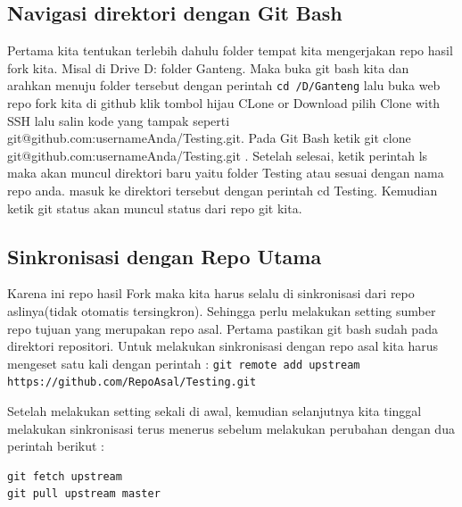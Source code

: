 \subsection{Navigasi direktori dengan Git Bash}
Pertama kita tentukan terlebih dahulu folder tempat kita mengerjakan repo hasil fork kita. Misal di Drive D: folder Ganteng. Maka buka git bash kita dan arahkan menuju folder tersebut dengan perintah \verb|cd /D/Ganteng| lalu buka web repo fork kita di github klik tombol hijau CLone or Download pilih Clone with SSH lalu salin kode yang tampak seperti git@github.com:usernameAnda/Testing.git. Pada Git Bash ketik git clone git@github.com:usernameAnda/Testing.git . Setelah selesai, ketik perintah ls maka akan muncul direktori baru yaitu folder Testing atau sesuai dengan nama repo anda. masuk ke direktori tersebut dengan perintah cd Testing. Kemudian ketik git status akan muncul status dari repo git kita.

\subsection{Sinkronisasi dengan Repo Utama}
Karena ini repo hasil Fork maka kita harus selalu di sinkronisasi dari repo aslinya(tidak otomatis tersingkron). Sehingga perlu melakukan setting sumber repo tujuan yang merupakan repo asal. Pertama pastikan git bash sudah pada direktori repositori. Untuk melakukan sinkronisasi dengan repo asal kita harus mengeset satu kali dengan perintah :
\verb|git remote add upstream https://github.com/RepoAsal/Testing.git|

Setelah melakukan setting sekali di awal, kemudian selanjutnya kita tinggal melakukan sinkronisasi terus menerus sebelum melakukan perubahan dengan dua perintah berikut :
\begin{verbatim}
git fetch upstream
git pull upstream master
\end{verbatim}


